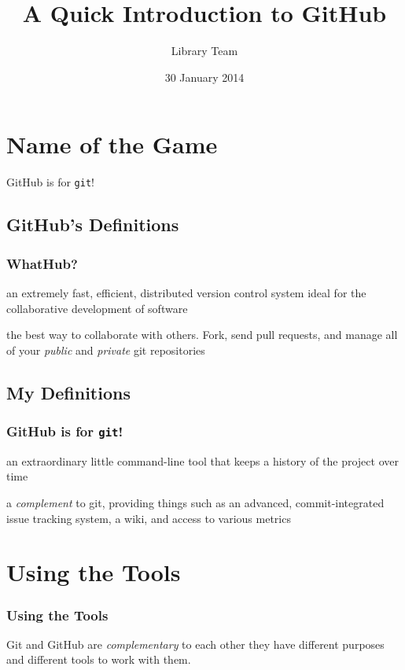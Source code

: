 \documentclass[xcolor=dvipsnames,handout]{beamer}
\author{Library Team}
\title{A Quick Introduction to GitHub}
\date{30 January 2014}
\newcommand\Dash{\unskip\thinspace\textemdash\thinspace\ignorespaces\-}
\begin{document}
\maketitle

\section{Name of the Game}
\begin{frame}
  \begin{center}
    GitHub is for \texttt{git}!
  \end{center}
\end{frame}

\subsection{GitHub's Definitions}
\begin{frame}
  \frametitle{WhatHub?}
  \begin{description}[<+(1)->]
  \item[git]
    an extremely fast, efficient, distributed version control system
    ideal for the collaborative development of software
  \item[GitHub]
    the best way to collaborate with others.
    Fork, send pull requests, and manage
    all of your \emph{public} and \emph{private} git repositories
  \end{description}
\end{frame}

\subsection{My Definitions}
\begin{frame}
  \frametitle{GitHub is for \texttt{git}!}
  \begin{description}[<+(1)->]
  \item[git]
    an extraordinary little command-line tool that
    keeps a history of the project over time
  \item[GitHub]
    a \emph{complement} to git, providing things such as
    an advanced, commit-integrated issue tracking system,
    a wiki, and access to various metrics
  \end{description}
\end{frame}

\section{Using the Tools}
\begin{frame}
  \frametitle{Using the Tools}
  \begin{center}
    Git and GitHub are \emph{complementary} to each other \Dash they
    have different purposes and different tools to work with them.
  \end{center}
\end{frame}
\end{document}
